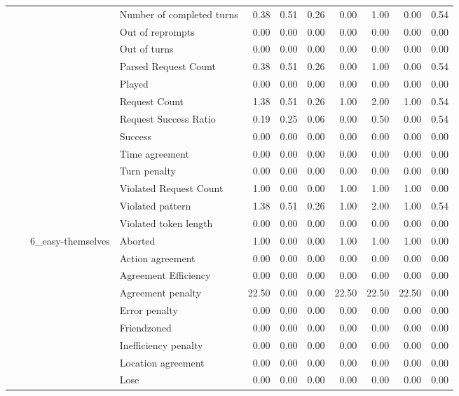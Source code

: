 \begin{tabular}{llllrrrrrrr}
 &  &  & Number of completed turns & 0.38 & 0.51 & 0.26 & 0.00 & 1.00 & 0.00 & 0.54 \\
 &  &  & Out of reprompts & 0.00 & 0.00 & 0.00 & 0.00 & 0.00 & 0.00 & 0.00 \\
 &  &  & Out of turns & 0.00 & 0.00 & 0.00 & 0.00 & 0.00 & 0.00 & 0.00 \\
 &  &  & Parsed Request Count & 0.38 & 0.51 & 0.26 & 0.00 & 1.00 & 0.00 & 0.54 \\
 &  &  & Played & 0.00 & 0.00 & 0.00 & 0.00 & 0.00 & 0.00 & 0.00 \\
 &  &  & Request Count & 1.38 & 0.51 & 0.26 & 1.00 & 2.00 & 1.00 & 0.54 \\
 &  &  & Request Success Ratio & 0.19 & 0.25 & 0.06 & 0.00 & 0.50 & 0.00 & 0.54 \\
 &  &  & Success & 0.00 & 0.00 & 0.00 & 0.00 & 0.00 & 0.00 & 0.00 \\
 &  &  & Time agreement & 0.00 & 0.00 & 0.00 & 0.00 & 0.00 & 0.00 & 0.00 \\
 &  &  & Turn penalty & 0.00 & 0.00 & 0.00 & 0.00 & 0.00 & 0.00 & 0.00 \\
 &  &  & Violated Request Count & 1.00 & 0.00 & 0.00 & 1.00 & 1.00 & 1.00 & 0.00 \\
 &  &  & Violated pattern & 1.38 & 0.51 & 0.26 & 1.00 & 2.00 & 1.00 & 0.54 \\
 &  &  & Violated token length & 0.00 & 0.00 & 0.00 & 0.00 & 0.00 & 0.00 & 0.00 \\
\cline{3-11}
 &  & \multirow[t]{27}{*}{6_easy-themselves} & Aborted & 1.00 & 0.00 & 0.00 & 1.00 & 1.00 & 1.00 & 0.00 \\
 &  &  & Action agreement & 0.00 & 0.00 & 0.00 & 0.00 & 0.00 & 0.00 & 0.00 \\
 &  &  & Agreement Efficiency & 0.00 & 0.00 & 0.00 & 0.00 & 0.00 & 0.00 & 0.00 \\
 &  &  & Agreement penalty & 22.50 & 0.00 & 0.00 & 22.50 & 22.50 & 22.50 & 0.00 \\
 &  &  & Error penalty & 0.00 & 0.00 & 0.00 & 0.00 & 0.00 & 0.00 & 0.00 \\
 &  &  & Friendzoned & 0.00 & 0.00 & 0.00 & 0.00 & 0.00 & 0.00 & 0.00 \\
 &  &  & Inefficiency penalty & 0.00 & 0.00 & 0.00 & 0.00 & 0.00 & 0.00 & 0.00 \\
 &  &  & Location agreement & 0.00 & 0.00 & 0.00 & 0.00 & 0.00 & 0.00 & 0.00 \\
 &  &  & Lose & 0.00 & 0.00 & 0.00 & 0.00 & 0.00 & 0.00 & 0.00 \\

\end{tabular}
